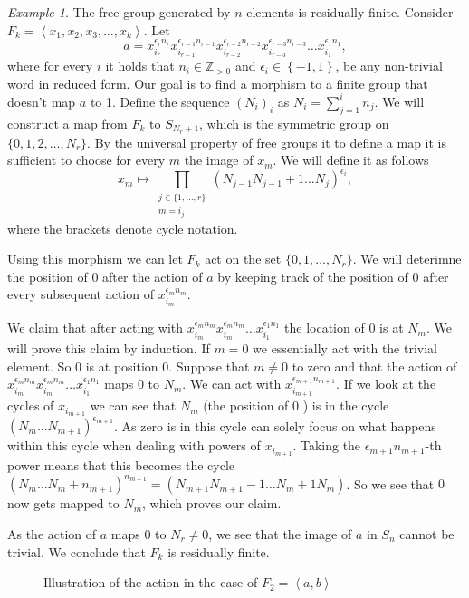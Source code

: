 \documentclass[titlepage, a4paper]{article}
\newcommand{\Z}{\mathbb{Z}}
\theoremstyle{remark}
\newtheorem{example}[theorem]{Example}
\begin{document}
\begin{example}
	The free group generated by $n$ elements is residually finite. 
	Consider $F_k = \left<x_1, x_2, x_3, \ldots, x_k \right>$.  %
Let \[
a = x_{i_r}^{\epsilon_r n_r}x_{i_{r-1}}^{\epsilon_{r-1}n_{r-1}}x_{i_{r-2}}^{\epsilon_{r-2}n_{r-2}}x_{i_{r-3}}^{\epsilon_{r-3}n_{r-3}} \ldots x_{i_1}^{\epsilon_1n_1}
,\]
where for every $i$ it holds that $n_i \in \Z_{>0}$ and $\epsilon_i \in \left\{ -1,1 \right\} $, be any non-trivial word in reduced form. 
Our goal is to find a morphism to a finite group that doesn't map $a$ to 1. 
Define the sequence $(N_i)_i$ as $N_i = \sum_{j = 1}^{i} n_j$. 
We will construct a map from $F_k$ to $S_{N_r + 1}$, which is the symmetric group on $\{0,1, 2, \ldots, N_{r}\} $.   %
By the universal property of free groups it to define a map it is sufficient to choose for every $m$ the image of $x_m$.
We will define it as follows
\[
x_m \mapsto \prod_{\substack{j \in \{1,\ldots, r\} \\ m = i_j} } (N_{j-1} N_{j-1}+1 \ldots N_{j})^{\epsilon_i} %
,\] 
where the brackets denote cycle notation.

Using this morphism we can let $F_k$ act on the set $\{0,1,\ldots, N_r\} $. 
We will deterimne the position of $0$ after the action of $a$ by keeping track of the position of $0$ after every subsequent  action of  $x_{i_m}^{\epsilon_m n_m}$.

We claim that after acting with $x_{i_{m}}^{\epsilon_{m}n_{m}}x_{i_{m}}^{\epsilon_{m}n_{m}} \ldots x_{i_1}^{\epsilon_1n_1}$ the location of  $0$ is at $N_m$.
We will prove this claim by induction.
If  $m=0$ we essentially act with the trivial element. So $0$ is at position $0$.
 Suppose that $m \ne 0$ to zero and that the action of $x_{i_{m}}^{\epsilon_{m}n_{m}}x_{i_{m}}^{\epsilon_{m}n_{m}} \ldots x_{i_1}^{\epsilon_1n_1}$ maps $0$ to $N_m$. 
 We can act with  $x_{i_{m+1}}^{\epsilon_{m+1}n_{m+1}}$. 
 If we look at the cycles of $x_{i_{m+1}}$ we can see that $N_m$ (the position of  $0$ ) is in the cycle $(N_m \ldots N_{m+1})^{\epsilon_{m+1}}$. As zero is in this cycle can solely focus on what happens within this cycle when dealing with powers of $x_{i_{m+1}}$. 
 Taking the $\epsilon _{m+1} n_{m+1}$-th power means that this becomes the cycle $(N_m \ldots N_{m} + n_{m+1})^{n_{m+1}} = (N_{m+1} N_{m+1}-1 \ldots N_m + 1 N_m)$. 
So we see that $0$ now gets mapped to $N_m$, which proves our claim.

As the action of  $a$ maps $0$ to $N_r \ne 0$, we see that the image of  $a$ in  $S_n$ cannot be trivial. 
We conclude that $F_k$ is residually finite.

\begin{figure}[ht]
	\centering
	
	\caption{Illustration of the action in the case of $F_2 = \left<a,b \right>$}
	\label{fig:}
\end{figure}

\end{example}
\end{document}
